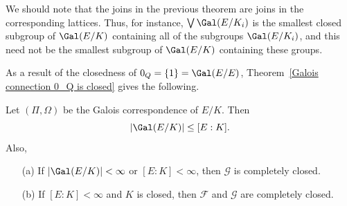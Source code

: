 We should note that the joins in the previous theorem are joins in the
corresponding lattices. Thus, for instance, $\bigvee \Gal(E/K_i)$ is the smallest closed subgroup of $\Gal(E/K)$ containing all of the subgroups $\Gal(E/K_i)$, and this need not be the smallest subgroup of $\Gal(E/K)$ containing these groups.\par
As a result of the closedness of $0_Q=\{1\}=\Gal(E/E)$, Theorem~\ref{Galois connection 0_Q is closed} gives the following.
\begin{corollary}
Let $(\Pi,\Omega)$ be the Galois correspondence of $E/K$. Then
\[|\Gal(E/K)|\leq[E:K].\]
Also,
\begin{itemize}
\item[(a)] If $|\Gal(E/K)|<\infty$ or $[E:K]<\infty$, then $\mathcal{G}$ is completely closed.
\item[(b)] If $[E:K]<\infty$ and $K$ is closed, then $\mathcal{F}$ and $\mathcal{G}$ are completely closed. 
\end{itemize}
\end{corollary}
